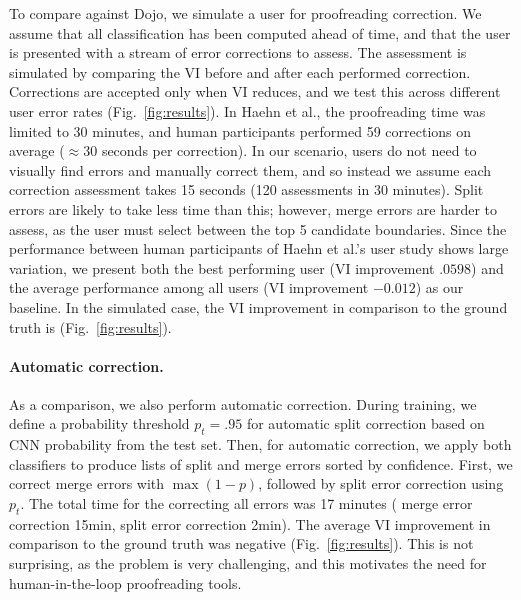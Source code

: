 To compare against Dojo, we simulate a user for proofreading correction. We assume that all classification has been computed ahead of time, and that the user is presented with a stream of error corrections to assess. The assessment is simulated by comparing the VI before and after each performed correction. Corrections are accepted only when VI reduces, and we test this across different user error rates (Fig.~\ref{fig:results}). In Haehn et al., the proofreading time was limited to 30 minutes, and human participants performed 59 corrections on average ($\approx30$ seconds per correction). In our scenario, users do not need to visually find errors and manually correct them, and so instead we assume each correction assessment takes 15 seconds (120 assessments in 30 minutes). Split errors are likely to take less time than this; however, merge errors are harder to assess, as the user must select between the top 5 candidate boundaries. Since the performance between human participants of Haehn et al.'s user study shows large variation, we present both the best performing user (VI improvement $.0598$) and the average performance among all users (VI improvement $-0.012$) as our baseline. In the simulated case, the VI improvement in comparison to the ground truth is  (Fig.~\ref{fig:results}).

\paragraph{Automatic correction.} As a comparison, we also perform automatic correction. During training, we define a probability threshold $p_t=.95$  for automatic split correction based on CNN probability from the test set. Then, for automatic correction, we apply both classifiers to produce lists of split and merge errors sorted by confidence. First, we correct merge errors with $\max(1-p)$, followed by split error correction using $p_t$. The total time for the correcting all \JT{\#} errors was 17 minutes (\JT{\#} merge error correction 15min, \JT{\#} split error correction 2min). The average VI improvement in comparison to the ground truth was negative (Fig.~\ref{fig:results}). This is not surprising, as the problem is very challenging, and this motivates the need for human-in-the-loop proofreading tools.


